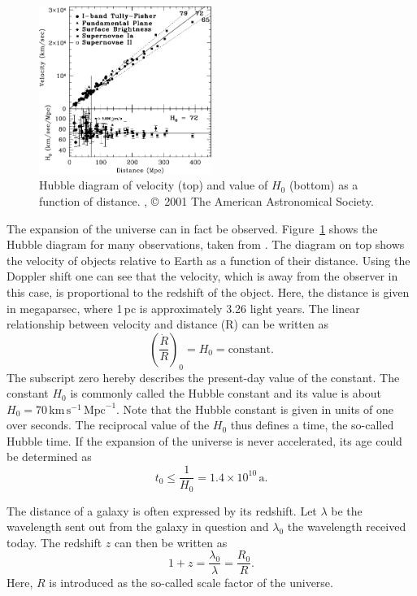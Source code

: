 \begin{figure}[tb]
    \centering
    \includegraphics[width=0.5\textwidth]{graphics/bbn/hubble_diagram}
    \caption{Hubble diagram of velocity (top) and value of $H_0$ (bottom) as a function of distance. \cite{freedman01}, \copyright\ 2001 The American Astronomical Society.} 
    \label{fig:bbn:hubble_diagram}
\end{figure}
The expansion of the universe can in fact be observed. Figure~\ref{fig:bbn:hubble_diagram} shows the Hubble diagram for many observations, taken from \citet{freedman01}. The diagram on top shows the velocity of objects relative to Earth as a function of their distance. Using the Doppler shift one can see that the velocity, which is away from the observer in this case, is proportional to the redshift of the object. Here, the distance is given in megaparsec, where 1\,\ac{pc} is approximately 3.26 light years. The linear relationship between velocity and distance (R) can be written as
\begin{equation}
    \left(\frac{\dot{R}}{R}\right)_0 = H_0 = \mathrm{constant}.
\end{equation}
The subscript zero hereby describes the present-day value of the constant. The constant $H_0$ is commonly called the Hubble constant and its value is about $H_0 = 70\,\mathrm{km}\,\mathrm{s}^{-1}\,\mathrm{Mpc}^{-1}$. Note that the Hubble constant is given in units of one over seconds. The reciprocal value of the $H_0$ thus defines a time, the so-called Hubble time. If the expansion of the universe is never accelerated, its age could be determined as
\begin{equation}
    t_0 \leq \frac{1}{H_0} = 1.4 \times 10^{10}\,\mathrm{a}.
\end{equation}

The distance of a galaxy is often expressed by its redshift. Let $\lambda$ be the wavelength sent out from the galaxy in question and $\lambda_0$ the wavelength received today. The redshift $z$ can then be written as
\begin{equation}\label{eqn:bbn:redshift}
    1+z = \frac{\lambda_0}{\lambda} = \frac{R_0}{R}.
\end{equation}
Here, $R$ is introduced as the so-called scale factor of the universe.

